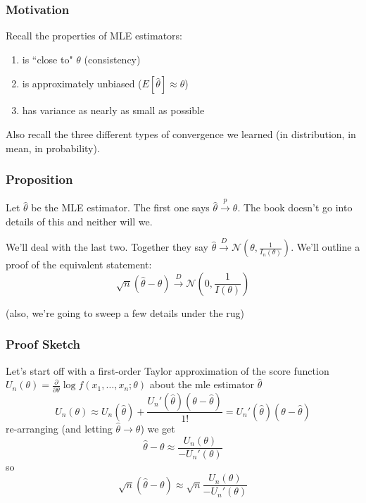 \documentclass{beamer}
\begin{document}


\begin{frame}
\frametitle{Motivation}

Recall the properties of MLE estimators:
\begin{enumerate}
\item is ``close to" $\theta$ (consistency)
\item is approximately unbiased ($E[\hat{\theta}] \approx \theta$)
\item has variance as nearly as small as possible
\end{enumerate}

Also recall the three different types of convergence we learned (in distribution, in mean, in probability).
\end{frame}

\begin{frame}
\frametitle{Proposition}

Let $\hat{\theta}$ be the MLE estimator. The first one says $\hat{\theta} \overset{p}{\rightarrow} \theta$. The book doesn't go into details of this and neither will we.
\newline

We'll deal with the last two. Together they say $\hat{\theta} \overset{D}{\rightarrow} \mathcal{N}(\theta, \frac{1}{I_n(\theta)} )$. We'll outline a proof of the equivalent statement:
\[
\sqrt{n} (\hat{\theta} - \theta)\overset{D}{\rightarrow} \mathcal{N}\left(0, \frac{1}{I(\theta)} \right)
\]

(also, we're going to sweep a few details under the rug)
\end{frame}

\begin{frame}
\frametitle{Proof Sketch}

Let's start off with a first-order Taylor approximation of the score function $U_n(\theta) = \frac{\partial}{\partial \theta} \log f(x_1, \ldots, x_n;\theta)$ about the mle estimator $\hat{\theta}$
\[
U_n(\theta) \approx U_n(\hat{\theta}) + \frac{U_n'(\hat{\theta})(\theta - \hat{\theta}) }{1!} = U_n'(\hat{\theta})(\theta - \hat{\theta}) 
\]
re-arranging (and letting $\hat{\theta} \to \theta$) we get
\[
\hat{\theta} - \theta \approx \frac{U_n(\theta)}{- U_n'(\theta)}
\]
so
\[
\sqrt{n}(\hat{\theta} - \theta) \approx \sqrt{n}\frac{U_n(\theta)}{- U_n'(\theta)}
\]
\end{frame}
\end{document}
